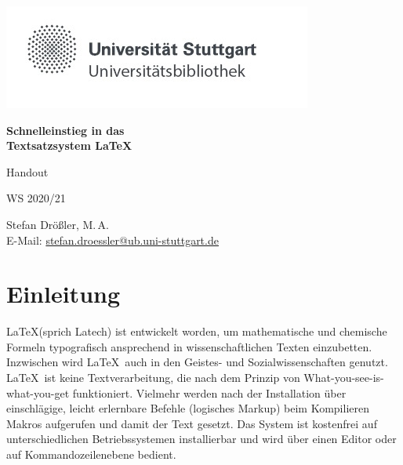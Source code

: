 \documentclass[11pt,a4paper]{scrartcl}
\begin{document}
\lstset{language=tex}
  \pagestyle{empty}

  \begin{titlepage}
    
    \center
    \includegraphics[scale=0.5]{ub-logo} 
    \vspace*{2cm} 

 \begin{center} \large 
        
    \vspace*{2cm}

    {\huge \textbf{Schnelleinstieg in das\\ Textsatzsystem \LaTeX}}
    \vspace*{2.5cm}

    Handout
    \vspace*{1.5cm}

    WS 2020/21
    \vspace*{4.5cm}

  \normalsize
    Stefan Drößler, M.\,A. \\[1cm]
    E-Mail: 
\href{mailto:stefan.droessler@ub.uni-stuttgart.de}{
stefan.droessler@ub.uni-stuttgart.de} \\[1cm]
  \end{center}
\end{titlepage}


  \tableofcontents
  
\newpage

  \pagestyle{headings}

\section*{Einleitung}
\LaTeX (sprich Latech) ist entwickelt worden, um mathematische und chemische 
Formeln typografisch ansprechend in wissenschaftlichen Texten einzubetten. 
Inzwischen wird \LaTeX\ auch in den Geistes- und Sozialwissenschaften genutzt. 
\LaTeX\ ist keine Textverarbeitung, die nach dem Prinzip von 
What-you-see-is-what-you-get funktioniert. Vielmehr werden nach der Installation 
über einschlägige, leicht erlernbare Befehle (logisches Markup) beim 
Kompilieren Makros aufgerufen und damit der Text gesetzt. Das System ist 
kostenfrei auf unterschiedlichen Betriebssystemen installierbar und wird über 
einen Editor oder auf Kommandozeilenebene bedient.
\end{document}
